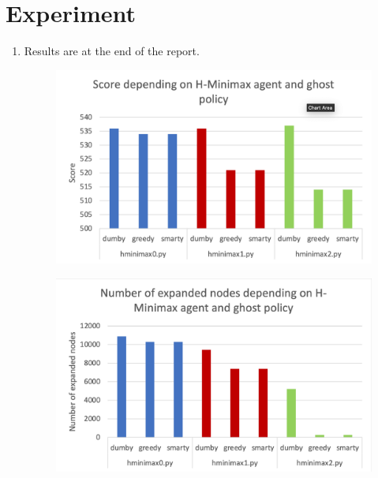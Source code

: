 \documentclass{article}
\begin{document}
\section{Experiment}

\begin{enumerate}[label=\alph*.,leftmargin=*]
    \item Results are at the end of the report.
    \begin{figure}[!hb]
    \centering 
    \includegraphics[scale = 0.5]{score}
    \end{figure}
    
    \begin{figure}[!hb]
    \centering 
    \includegraphics[scale = 0.5]{nodes}
    \end{figure}
    

\end{enumerate}
\end{document}
